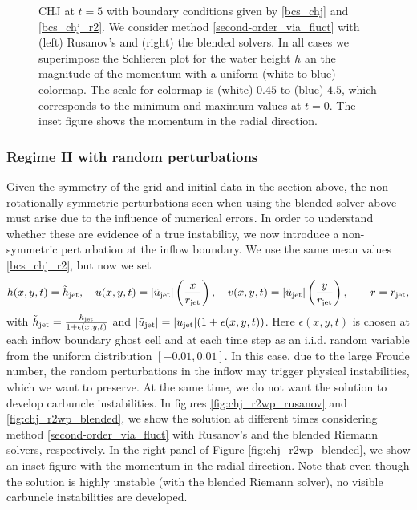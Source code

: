 \documentclass[preprint, 11pt]{article}
\newcommand{\jet}{{\textup{jet}}}
\newcommand{\bfu}{{u}}
\begin{document}
\begin{figure}[!h]
  \caption{CHJ at $t=5$ with boundary conditions given by \eqref{bcs_chj} and \eqref{bcs_chj_r2}. 
    We consider method \eqref{second-order_via_fluct} with (left) Rusanov's
    and (right) the blended solvers. 
    In all cases we superimpose the Schlieren plot for the water height $h$
    an the magnitude of the momentum with a uniform (white-to-blue) colormap. 
    The scale for colormap is (white) $0.45$ to (blue) $4.5$, 
    which corresponds to the minimum and maximum values at $t=0$.
    The inset figure shows the momentum in the radial direction.
    \label{fig:chj_r2_later}}
\end{figure}

\subsubsection{Regime II with random perturbations}\label{sec:regime_iiwp}
Given the symmetry of the grid and initial data in the section above,
the non-rotationally-symmetric perturbations seen when using the blended
solver above must arise due to the influence of numerical errors.
In order to understand whether these are evidence of a true instability,
we now introduce a non-symmetric perturbation at the inflow boundary.
We use the same mean values \eqref{bcs_chj_r2}, but now we set
\begin{subequations}
  \begin{align}
    h(x,y,t)=\tilde h_\jet, \quad
    u(x,y,t)=|\tilde \bfu_\jet| \left(\frac{x}{r_\jet}\right), \quad
    v(x,y,t)=|\tilde \bfu_\jet| \left(\frac{y}{r_\jet}\right), \qquad r=r_\jet,
  \end{align}
\end{subequations}
with $\tilde h_\jet = \frac{h_\jet}{1+\epsilon(x,y,t)}$ and $|\tilde\bfu_\jet|=|\bfu_\jet|(1+\epsilon(x,y,t))$.
Here $\epsilon(x,y,t)$ is chosen at each inflow boundary ghost cell and at each
time step as an i.i.d. random variable from the uniform distribution $[-0.01,0.01]$.
In this case, due to the large Froude number, the random perturbations in the inflow
may trigger physical instabilities, which we want to preserve. At the same time, we
do not want the solution to develop carbuncle instabilities.
In figures \ref{fig:chj_r2wp_rusanov} and \ref{fig:chj_r2wp_blended}, we show the solution
at different times considering method \eqref{second-order_via_fluct} with Rusanov's and
the blended Riemann solvers, respectively.
In the right panel of Figure \ref{fig:chj_r2wp_blended}, we show an inset figure 
with the momentum in the radial direction. Note that even though the solution is highly unstable 
(with the blended Riemann solver), no visible carbuncle instabilities are developed. 
\end{document}
